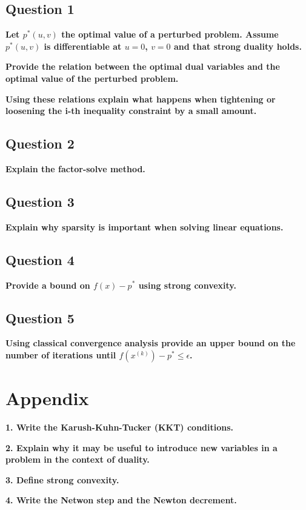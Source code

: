 
\subsection*{Question 1}
\textbf{Let $p^*(u, v)$ the optimal value of a perturbed problem. Assume $p^*(u, v)$ is diﬀerentiable at $u = 0$, $v = 0$ and that strong duality holds.}

\noindent \textbf{Provide the relation between the optimal dual variables and the optimal value of the perturbed problem.} 

\noindent \textbf{Using these relations explain what happens when tightening or loosening the i-th inequality constraint by a small amount.}



\subsection*{Question 2}
\textbf{Explain the factor-solve method.}

\subsection*{Question 3}
\textbf{Explain why sparsity is important when solving linear equations.}

\subsection*{Question 4}
\textbf{Provide a bound on $f (x) - p^*$ using strong convexity.}

\subsection*{Question 5}
\textbf{Using classical convergence analysis provide an upper bound on the number of iterations until $f (x^{(k)}) - p^* \leq \epsilon$.}




\section*{Appendix}
\noindent\textbf{1. \; Write the Karush-Kuhn-Tucker (KKT) conditions.}


\noindent\textbf{2. \; Explain why it may be useful to introduce new variables in a problem in the context of duality.}


\noindent\textbf{3. \; Define strong convexity.}




\noindent\textbf{4. \; Write the Netwon step and the Newton decrement.}






